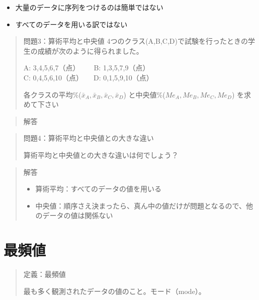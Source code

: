 \documentclass[
]{book}
\providecommand{\tightlist}{%
  \setlength{\itemsep}{0pt}\setlength{\parskip}{0pt}}
\theoremstyle{definition}
\theoremstyle{definition}
\theoremstyle{definition}
\theoremstyle{definition}
\theoremstyle{remark}
\begin{document}
\begin{itemize}
\tightlist
\item
  大量のデータに序列をつけるのは簡単ではない
\item
  すべてのデータを用いる訳ではない
\end{itemize}

\begin{quote}
問題3：算術平均と中央値
4つのクラス(A,B,C,D)で試験を行ったときの学生の成績が次のように得られました。

\begin{center}
A: 3,4,5,6,7（点）~~~~B: 1,3,5,7,9（点） \\
C: 0,4,5,6,10（点）~~~D: 0,1,5,9,10（点）
\end{center}

各クラスの平均\%(\(\bar{x}_A,\bar{x}_B,\bar{x}_C,\bar{x}_D\))
と中央値\%(\(Me_A,Me_B,Me_C,Me_D\))
を求めて下さい
\end{quote}

\begin{quote}
解答
\end{quote}

\begin{quote}
問題4：算術平均と中央値との大きな違い

算術平均と中央値との大きな違いは何でしょう？
\end{quote}

\begin{quote}
解答

\begin{itemize}
\tightlist
\item
  算術平均：すべてのデータの値を用いる
\item
  中央値：順序さえ決まったら、真ん中の値だけが問題となるので、他のデータの値は関係ない
\end{itemize}
\end{quote}

\hypertarget{ux6700ux983bux5024}{%
\section{最頻値}\label{ux6700ux983bux5024}}

\begin{quote}
定義：最頻値

最も多く観測されたデータの値のこと。モード（mode）。
\end{quote}
\end{document}

